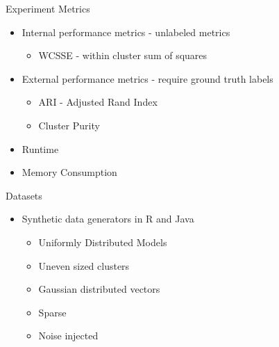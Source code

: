 \documentclass[12pt]{beamer}
\begin{document}
\begin{frame}[plain]{Experiment Metrics}
 \begin{itemize}
  \item Internal performance metrics - unlabeled metrics
  \begin{itemize}
    \item WCSSE - within cluster sum of squares
  \end{itemize}
  \item External performance metrics - require ground truth labels
  \begin{itemize}
    \item ARI - Adjusted Rand Index
    \item Cluster Purity
  \end{itemize}
  \item Runtime
  \item Memory Consumption
 \end{itemize}
\end{frame}

\begin{frame}[plain]{Datasets}
\begin{itemize}
 \item Synthetic data generators in R and Java
 \begin{itemize}
   \item Uniformly Distributed Models
   \item Uneven sized clusters
   \item Gaussian distributed vectors
   \item Sparse
   \item Noise injected
\end{itemize}
\end{itemize}
\vspace*{-2\bigskipamount}
 \begin{table}
\centering
{}
\end{table}
\end{frame}
\end{document}
